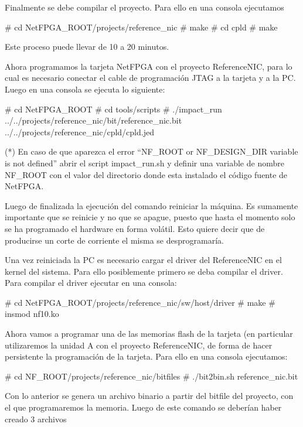Finalmente se debe compilar el proyecto. Para ello en una consola ejecutamos

\begin{bash}
# cd NetFPGA_ROOT/projects/reference_nic
# make
# cd cpld
# make
\end{bash}

Este proceso puede llevar de 10 a 20 minutos.

Ahora programamos la tarjeta NetFPGA con el proyecto ReferenceNIC, para lo cual es necesario conectar el cable de programación JTAG a la tarjeta y a la PC. Luego en una consola se ejecuta lo siguiente:

\begin{bash}
# cd NetFPGA_ROOT
# cd tools/scripts
# ./impact_run 
  ../../projects/reference_nic/bit/reference_nic.bit 
  ../../projects/reference_nic/cpld/cpld.jed 
\end{bash}

(*) En caso de que aparezca el error “NF\_ROOT or NF\_DESIGN\_DIR variable is not defined”
abrir el script impact\_run.sh y definir una variable de nombre NF\_ROOT con el valor del directorio donde esta instalado el código fuente de NetFPGA.

Luego de finalizada la ejecución del comando reiniciar la máquina. Es sumamente importante que se reinicie y no que se apague, puesto que hasta el momento solo se ha programado el hardware en forma volátil. Esto quiere decir que de producirse un corte de corriente el misma se desprogramaría.

Una vez reiniciada la PC es necesario cargar el driver del ReferenceNIC en el kernel del sistema. Para ello posiblemente primero se deba compilar el driver. Para compilar el driver ejecutar en una consola:

\begin{bash}
# cd NetFPGA_ROOT/projects/reference_nic/sw/host/driver
# make
# insmod nf10.ko
\end{bash}

Ahora vamos a programar una de las memorias flash de la tarjeta (en particular utilizaremos la unidad A con el proyecto ReferenceNIC, de forma de hacer persistente la programación de la tarjeta. Para ello en una consola ejecutamos:

\begin{bash}
# cd NF_ROOT/projects/reference_nic/bitfiles
# ./bit2bin.sh reference_nic.bit
\end{bash}

Con lo anterior se genera un archivo binario a partir del bitfile del proyecto, con el que programaremos la memoria. Luego de este comando se deberían haber creado 3 archivos


